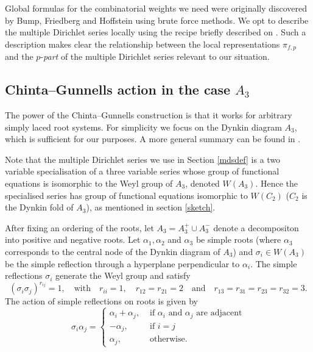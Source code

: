 \documentclass[12pt,reqno]{amsart}
\theoremstyle{plain}
\theoremstyle{remark}
\numberwithin{equation}{section}
\numberwithin{lemma}{section}
\numberwithin{theorem}{section}
\numberwithin{prop}{section}
\numberwithin{remark}{section}
\begin{document}
Global formulas for the combinatorial weights we need were originally discovered by 
Bump, Friedberg and Hoffstein \cite[Theorem~1.2]{BFH} using brute force methods.
We opt to describe the multiple Dirichlet series locally using the recipe briefly 
described on \cite[pg.~331]{CG1}. Such a description makes clear 
the relationship between the local representations $\pi_{f,p}$ and
the $p$-\emph{part} of the multiple Dirichlet series relevant to our situation.

\subsection{Chinta--Gunnells action in the case $A_3$}
The power of the Chinta--Gunnells construction \cite{CG1,CG2} is that it works for arbitrary simply laced root systems.
For simplicity we focus on the Dynkin diagram $A_3$, which is sufficient for our purposes. A more general summary 
can be found in \cite[Section~2.1]{Di}.

Note that the multiple Dirichlet series we use in Section \ref{mdsdef}
is a two variable specialisation of a three variable series whose group of functional
equations is isomorphic to the Weyl group of $A_3$, denoted $W(A_3)$. Hence the specialised series 
has group of functional equations isomorphic to $W(C_2)$ 
($C_2$ is the Dynkin fold of $A_3$), as mentioned in section \ref{sketch}.

After fixing an ordering of the roots, let $A_3=A_3^{+} \cup A_3^{-}$ denote a decompositon
into positive and negative roots. Let  $\alpha_1,\alpha_2$ and $\alpha_3$ be simple roots 
(where $\alpha_3$ corresponds to the central node of the Dynkin diagram of $A_3$)
and $\sigma_i \in W(A_3)$ be the simple reflection through a hyperplane perpendicular 
to $\alpha_i$. The simple reflections $\sigma_i$ generate the Weyl group and satisfy  
\begin{equation*}
(\sigma_i \sigma_j)^{r_{ij}}=1, \quad \text{with} \quad r_{ii}=1, 
\quad r_{12}=r_{21}=2 \quad \text{and} \quad r_{13}=r_{31}=r_{23}=r_{32}=3.
\end{equation*}
The action of simple reflections on 
roots is given by 
\begin{equation*}
\sigma_i \alpha_j=
\begin{cases}
\alpha_i+\alpha_j ,& \text{ if } \alpha_i \text{ and } \alpha_j \text{ are adjacent} \\
-\alpha_j, & \text{ if } i=j \\
\alpha_j, & \text{ otherwise}.
\end{cases}
\end{equation*}
\end{document}
